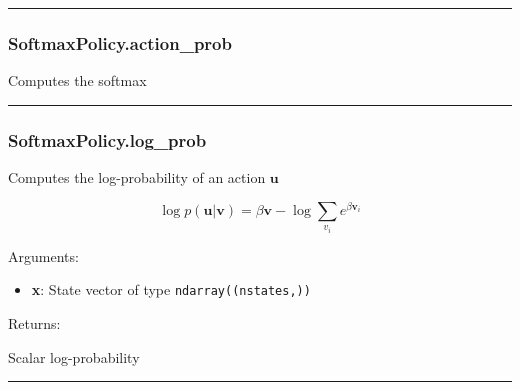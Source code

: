 \begin{center}\rule{0.5\linewidth}{\linethickness}\end{center}

\hypertarget{softmaxpolicy.action_prob}{%
\subsubsection{SoftmaxPolicy.action\_prob}\label{softmaxpolicy.action_prob}}

\begin{Shaded}
\begin{Highlighting}[]
\end{Highlighting}
\end{Shaded}

Computes the softmax

\begin{center}\rule{0.5\linewidth}{\linethickness}\end{center}

\hypertarget{softmaxpolicy.log_prob}{%
\subsubsection{SoftmaxPolicy.log\_prob}\label{softmaxpolicy.log_prob}}

\begin{Shaded}
\begin{Highlighting}[]
\end{Highlighting}
\end{Shaded}

Computes the log-probability of an action \(\mathbf u\)

\[
\log p(\mathbf u|\mathbf v) = \beta \mathbf v - \log \sum_{v_i} e^{\beta \mathbf v_i}
\]

Arguments:

\begin{itemize}
\tightlist
\item
  \textbf{x}: State vector of type \texttt{ndarray((nstates,))}
\end{itemize}

Returns:

Scalar log-probability

\begin{center}\rule{0.5\linewidth}{\linethickness}\end{center}

